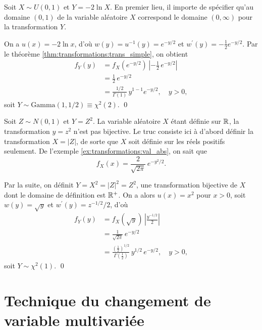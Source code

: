\begin{exemple}
  Soit $X \sim U(0, 1)$ et $Y = -2 \ln X$. En premier lieu, il importe
  de spécifier qu'au domaine $(0, 1)$ de la variable aléatoire $X$
  correspond le domaine $(0, \infty)$ pour la transformation $Y$.

  On a $u(x) = -2 \ln x$, d'où $w(y) = u^{-1}(y) = e^{-y/2}$ et
  $w^\prime(y) = -\frac{1}{2} e^{-y/2}$. Par le théorème
  \ref{thm:transformations:trans_simple}, on obtient
  \begin{align*}
    f_Y(y)
    &= f_X(e^{-y/2})\,
    \left|
      - \frac{1}{2}\, e^{-y/2}
    \right| \\
    &= \frac{1}{2}\, e^{-y/2} \\
    &= \frac{1/2}{\Gamma(1)}\, y^{1 - 1} e^{-y/2}, \quad y > 0,
  \end{align*}
  soit $Y \sim \text{Gamma}(1, 1/2) \equiv \chi^2(2)$.
  \qed
\end{exemple}

\begin{exemple}
  Soit $Z \sim N(0, 1)$ et $Y = Z^2$. La variable aléatoire $X$ étant
  définie sur $\mathbb{R}$, la transformation $y = z^2$ n'est pas bijective.
  Le truc consiste ici à d'abord définir la transformation $X = |Z|$,
  de sorte que $X$ soit définie sur les réels positifs seulement. De
  l'exemple \ref{ex:transformations:val_abs}, on sait que
  \begin{displaymath}
    f_X(x) = \frac{2}{\sqrt{2\pi}}\, e^{-y^2/2}.
  \end{displaymath}

  Par la suite, on définit $Y = X^2 = |Z|^2 = Z^2$, une transformation
  bijective de $X$ dont le domaine de définition est $\mathbb{R}^+$. On a
  alors $u(x) = x^2$ pour $x > 0$, soit $w(y) = \sqrt{y}$ et
  $w^\prime(y) = z^{-1/2}/2$, d'où
  \begin{align*}
    f_Y(y)
    &= f_X(\sqrt{y})\,
    \left|
      \frac{y^{-1/2}}{2}
    \right| \\
    &= \frac{1}{\sqrt{2\pi}}\, e^{-y/2} \\
    &= \frac{(\frac{1}{2})^{1/2}}{\Gamma(\frac{1}{2})}\, y^{1/2}\,
    e^{-y/2}, \quad y > 0,
  \end{align*}
  soit $Y \sim \chi^2(1)$.
  \qed
\end{exemple}



\section{Technique du changement de variable multivariée}

